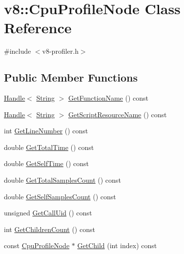 \hypertarget{classv8_1_1_cpu_profile_node}{}\section{v8\+:\+:Cpu\+Profile\+Node Class Reference}
\label{classv8_1_1_cpu_profile_node}


{\ttfamily \#include $<$v8-\/profiler.\+h$>$}

\subsection*{Public Member Functions}
\begin{DoxyCompactItemize}
\item 
\hyperlink{classv8_1_1_handle}{Handle}$<$ \hyperlink{classv8_1_1_string}{String} $>$ \hyperlink{classv8_1_1_cpu_profile_node_affbc7842b66986012285602ab65aa5f8}{Get\+Function\+Name} () const 
\item 
\hyperlink{classv8_1_1_handle}{Handle}$<$ \hyperlink{classv8_1_1_string}{String} $>$ \hyperlink{classv8_1_1_cpu_profile_node_a140dd536e7096701a36be0083c18c268}{Get\+Script\+Resource\+Name} () const 
\item 
int \hyperlink{classv8_1_1_cpu_profile_node_a45ea035661c7152e4f3eb47f73787a75}{Get\+Line\+Number} () const 
\item 
double \hyperlink{classv8_1_1_cpu_profile_node_a49f16893b9f9c94c58ea845fb039330a}{Get\+Total\+Time} () const 
\item 
double \hyperlink{classv8_1_1_cpu_profile_node_aa2e4d36f22f49726715ed36fef5a23b6}{Get\+Self\+Time} () const 
\item 
double \hyperlink{classv8_1_1_cpu_profile_node_a0e719d2013377f03583342c28fb5cb27}{Get\+Total\+Samples\+Count} () const 
\item 
double \hyperlink{classv8_1_1_cpu_profile_node_a78537aa4471d6c1ebc37993f711090db}{Get\+Self\+Samples\+Count} () const 
\item 
unsigned \hyperlink{classv8_1_1_cpu_profile_node_a245092eb223b948fc9441664d9e2701e}{Get\+Call\+Uid} () const 
\item 
int \hyperlink{classv8_1_1_cpu_profile_node_ac4612b91e43a2901ac20c3705288955b}{Get\+Children\+Count} () const 
\item 
const \hyperlink{classv8_1_1_cpu_profile_node}{Cpu\+Profile\+Node} $\ast$ \hyperlink{classv8_1_1_cpu_profile_node_aa397db1e0f5147155164c5ea3e854d69}{Get\+Child} (int index) const 
\end{DoxyCompactItemize}
